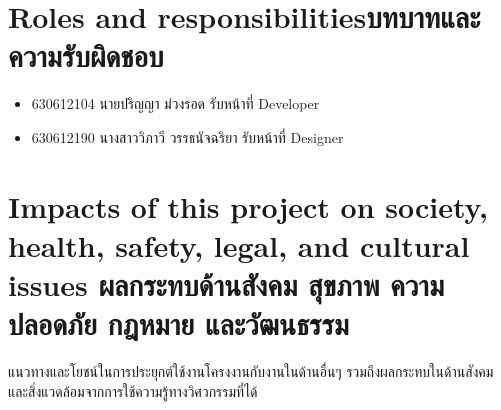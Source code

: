 \section{\ifenglish Roles and responsibilities\else บทบาทและความรับผิดชอบ\fi}
\begin{itemize}
    \item[] 630612104 นายปริญญา ม่วงรอด รับหน้าที่ Developer
    \item[] 630612190 นางสาววิภาวี วรรธนัจฉริยา รับหน้าที่ Designer
\end{itemize}

\section{\ifenglish%
Impacts of this project on society, health, safety, legal, and cultural issues
\else%
ผลกระทบด้านสังคม สุขภาพ ความปลอดภัย กฎหมาย และวัฒนธรรม
\fi}


แนวทางและโยชน์ในการประยุกต์ใช้งานโครงงานกับงานในด้านอื่นๆ รวมถึงผลกระทบในด้านสังคมและสิ่งแวดล้อมจากการใช้ความรู้ทางวิศวกรรมที่ได้
